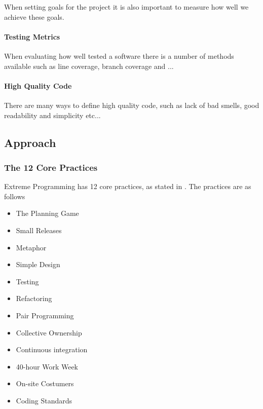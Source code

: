 When setting goals for the project it is also important to measure how well we achieve these goals. 
\paragraph{Testing Metrics}
When evaluating how well tested a software there is a number of methods available such as line coverage, branch coverage and ...

\paragraph{High Quality Code}
There are many ways to define high quality code, such as lack of bad smells, good readability and simplicity etc...




%

\subsection{Approach}
\subsubsection{The 12 Core Practices}
Extreme Programming has 12 core practices, as stated in \citep{xp:explained}. The practices are as follows

\begin{itemize}
\item The Planning Game
\item Small Releases
\item Metaphor
\item Simple Design
\item Testing
\item Refactoring
\item Pair Programming
\item Collective Ownership
\item Continuous integration
\item 40-hour Work Week
\item On-site Costumers
\item Coding Standards
\end{itemize}

